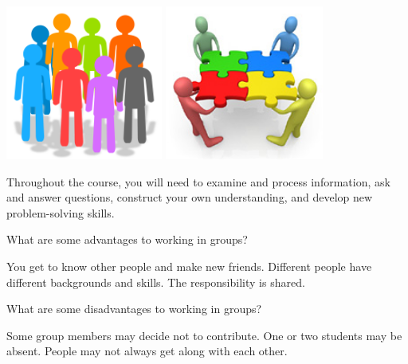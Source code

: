 

\begin{center}
\includegraphics[height=2in]{group.png}
\hspace{0.25in}
\includegraphics[height=2in]{team.jpg}
\end{center}

Throughout the course, you will need to examine and process information, ask and answer questions, construct your own understanding, and develop new problem-solving skills.



\Q What are some advantages to working in groups?

\begin{answer}
You get to know other people and make new friends.
Different people have different backgrounds and skills.
The responsibility is shared.
\end{answer}

\Q What are some disadvantages to working in groups?

\begin{answer}
Some group members may decide not to contribute.
One or two students may be absent.
People may not always get along with each other.
\end{answer}

